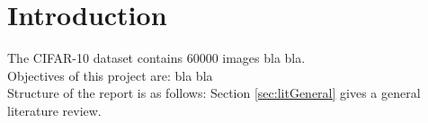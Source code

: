 \section{Introduction}
    \pagestyle{tom}
    
The CIFAR-10 dataset contains 60000 images bla bla.\\

Objectives of this project are: bla bla\\
Structure of the report is as follows: Section \ref{sec:litGeneral} gives a general literature review.\\